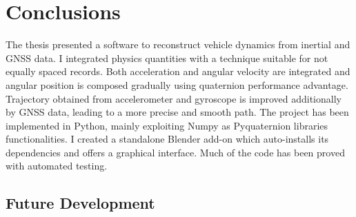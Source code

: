 \chapter{Conclusions}
\label{chap:conclusions}

The thesis presented a software to reconstruct vehicle dynamics from inertial and GNSS data.
I integrated physics quantities with a technique suitable for not equally spaced records. Both acceleration and angular velocity are integrated and angular position is composed gradually using quaternion performance advantage.
Trajectory obtained from accelerometer and gyroscope is improved additionally by GNSS data, leading to a more precise and smooth path.
The project has been implemented in Python, mainly exploiting Numpy as Pyquaternion libraries functionalities.
I created a standalone Blender add-on which auto-installs its dependencies and offers a graphical interface. Much of the code has been proved with automated testing.

\section{Future Development}
